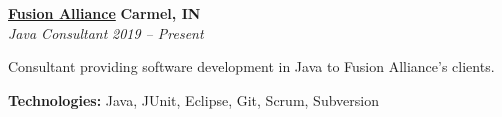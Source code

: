 %
    \headerrow
        {\textbf{\href{https://fusionalliance.com/}{Fusion Alliance}}}
        {\textbf{Carmel, IN}}
    \\
    \headerrow
        {\emph{Java Consultant}}
        {\emph{2019 -- Present}}
    \begin{itemize*}
        \item Consultant providing software development in Java to Fusion Alliance's clients.
    \end{itemize*}

    \hspace{1.0em}
        {\textbf{Technologies:} Java, JUnit, Eclipse, Git, Scrum, Subversion}
